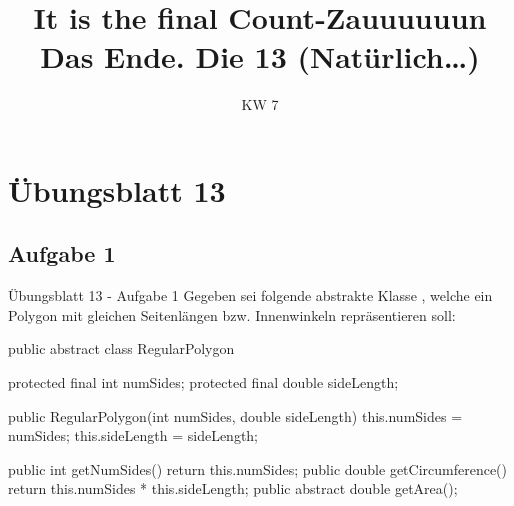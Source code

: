 \relax\relax

\iffull
\def\smlll{\texorpdfstring{\def\RSsmallest{2pt}\smaller[2]}{}}
\title[Dreizehntes Tutorium -- Übungsblatt 13]{It is the final Count-Zauuuuuun\\\small Das Ende. Die 13 (Natürlich\ldots)}
\date{\sffamily KW 7}

\usepackage[glows]{tikzpingus}
\usetikzlibrary{decorations.text,matrix}
\hypersetup{colorlinks=false}


\fi

\section{Übungsblatt 13}
\subsection{Aufgabe 1}

\iffull
\begin{frame}[c,fragile]{Übungsblatt 13 - Aufgabe 1}
%
\pause Gegeben sei folgende abstrakte Klasse , welche ein Polygon mit gleichen Seitenlängen bzw. Innenwinkeln repräsentieren soll:
\begin{plainjava}[morekeywords={[3]{RegularPolygon}}]
public abstract class RegularPolygon {
    protected final int numSides;
    protected final double sideLength;

    public RegularPolygon(int numSides, double sideLength) {
        this.numSides = numSides;
        this.sideLength = sideLength;
    }

    public int getNumSides() { return this.numSides; }
    public double getCircumference() { return this.numSides * this.sideLength; }
    public abstract double getArea();
}
\end{plainjava}
\end{frame}

